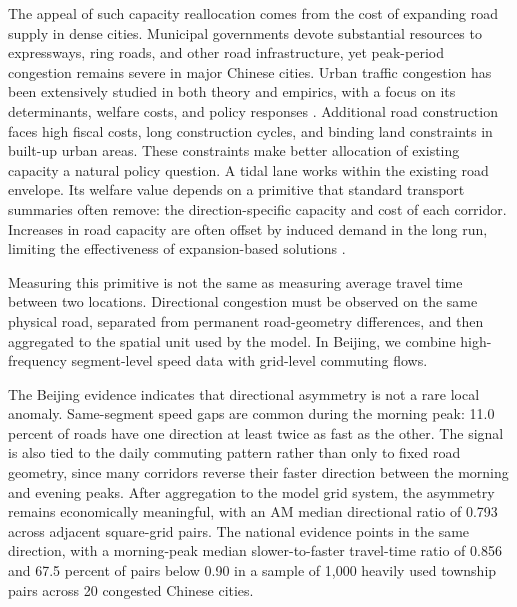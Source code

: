 \documentclass[12pt]{article}
\begin{document}
The appeal of such capacity reallocation comes from the cost of expanding road supply in dense cities. Municipal governments devote substantial resources to expressways, ring roads, and other road infrastructure, yet peak-period congestion remains severe in major Chinese cities. Urban traffic congestion has been extensively studied in both theory and empirics, with a focus on its determinants, welfare costs, and policy responses \citep{Vickrey1969,Arnott1993,DurantonTurner2011,CoutureDurantonTurner2018}. Additional road construction faces high fiscal costs, long construction cycles, and binding land constraints in built-up urban areas. These constraints make better allocation of existing capacity a natural policy question. A tidal lane works within the existing road envelope. Its welfare value depends on a primitive that standard transport summaries often remove: the direction-specific capacity and cost of each corridor. Increases in road capacity are often offset by induced demand in the long run, limiting the effectiveness of expansion-based solutions \citep{DurantonTurner2011}.

Measuring this primitive is not the same as measuring average travel time between two locations. Directional congestion must be observed on the same physical road, separated from permanent road-geometry differences, and then aggregated to the spatial unit used by the model. In Beijing, we combine high-frequency segment-level speed data with grid-level commuting flows. 


The Beijing evidence indicates that directional asymmetry is not a rare local anomaly. Same-segment speed gaps are common during the morning peak: 11.0 percent of roads have one direction at least twice as fast as the other. The signal is also tied to the daily commuting pattern rather than only to fixed road geometry, since many corridors reverse their faster direction between the morning and evening peaks. After aggregation to the model grid system, the asymmetry remains economically meaningful, with an AM median directional ratio of 0.793 across adjacent square-grid pairs. The national evidence points in the same direction, with a morning-peak median slower-to-faster travel-time ratio of 0.856 and 67.5 percent of pairs below 0.90 in a sample of 1,000 heavily used township pairs across 20 congested Chinese cities.
\end{document}
